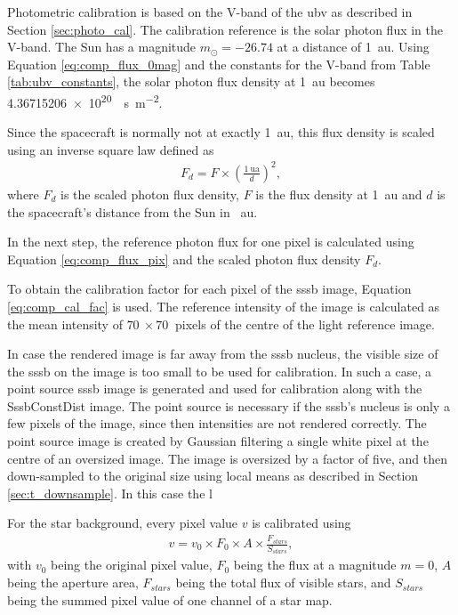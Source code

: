 Photometric calibration is based on the V-band of the \gls{ubv} as described in Section \ref{sec:photo_cal}. The calibration reference is the solar photon flux in the V-band. The Sun has a magnitude $m_{\odot} = -26.74$ at a distance of \SI{1}{\astronomicalunit}. Using Equation \ref{eq:comp_flux_0mag} and the constants for the V-band from Table \ref{tab:ubv_constants}, the solar photon flux density at \SI{1}{\astronomicalunit} becomes \SI{4.36715206e+20}{\per\second\per\square\meter}.
 
Since the spacecraft is normally not at exactly \SI{1}{\astronomicalunit}, this flux density is scaled using an inverse square law defined as
\begin{align}
    F_d = F \times \left(\frac{\SI{1}{\astronomicalunit}}{d}\right)^2, \label{eq:inverse_square}
\end{align}
where $F_d$ is the scaled photon flux density, $F$ is the flux density at \SI{1}{\astronomicalunit} and $d$ is the spacecraft's distance from the Sun in \SI{}{\astronomicalunit}.

In the next step, the reference photon flux for one pixel is calculated using Equation \ref{eq:comp_flux_pix} and the scaled photon flux density $F_d$.

To obtain the calibration factor for each pixel of the \gls{sssb} image, Equation \ref{eq:comp_cal_fac} is used. The reference intensity of the image is calculated as the mean intensity of $\SI{70}{}\times\SI{70}{}$ pixels of the centre of the light reference image.

In case the rendered image is far away from the \gls{sssb} nucleus, the visible size of the \gls{sssb} on the image is too small to be used for calibration. In such a case, a point source \gls{sssb} image is generated and used for calibration along with the SssbConstDist image. The point source is necessary if the \gls{sssb}'s nucleus is only a few pixels of the image, since then intensities are not rendered correctly. The point source image is created by Gaussian filtering a single white pixel at the centre of an oversized image. The image is oversized by a factor of five, and then down-sampled to the original size using local means as described in Section \ref{sec:t_downsample}. In this case the l

For the star background, every pixel value $v$ is calibrated using
\begin{align}
        v = v_0 \times F_0 \times A \times \frac{F_{stars}}{S_{stars}}, \label{eq:comp_cal_starmap}
\end{align}
with $v_0$ being the original pixel value, $F_0$ being the flux at a magnitude $m = 0$, $A$ being the aperture area, $F_{stars}$ being the total flux of visible stars, and $S_{stars}$ being the summed pixel value of one channel of a star map.

